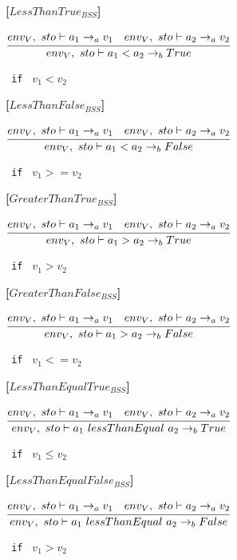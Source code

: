 \textbf{[$LessThanTrue_{BSS}$]}
\begin{center}
	\begin{math}
	\cfrac
	{env_V,\ sto \vdash a_1 \rightarrow_a v_1 \quad env_V,\ sto \vdash a_2 \rightarrow_a v_2}
	{env_V,\ sto \vdash a_1 < a_2 \rightarrow_b True}
	\end{math}
	
	\texttt{ if } $v_1 < v_2$
\end{center}

\textbf{[$LessThanFalse_{BSS}$]}
\begin{center}
	\begin{math}
	\cfrac
	{env_V,\ sto \vdash a_1 \rightarrow_a v_1 \quad env_V,\ sto \vdash a_2 \rightarrow_a v_2}
	{env_V,\ sto \vdash a_1 < a_2 \rightarrow_b False}
	\end{math}
	
	\texttt{ if } $v_1 >= v_2$
\end{center}

\textbf{[$GreaterThanTrue_{BSS}$]}
\begin{center}
	\begin{math}
	\cfrac
	{env_V,\ sto \vdash a_1 \rightarrow_a v_1 \quad env_V,\ sto \vdash a_2 \rightarrow_a v_2}
	{env_V,\ sto \vdash a_1 > a_2 \rightarrow_b True}
	\end{math}
	
	\texttt{ if } $v_1 > v_2$
\end{center}

\textbf{[$GreaterThanFalse_{BSS}$]}
\begin{center}
	\begin{math}
	\cfrac
	{env_V,\ sto \vdash a_1 \rightarrow_a v_1 \quad env_V,\ sto \vdash a_2 \rightarrow_a v_2}
	{env_V,\ sto \vdash a_1 > a_2 \rightarrow_b False}
	\end{math}
	
	\texttt{ if } $v_1 <= v_2$
\end{center}

\textbf{[$LessThanEqualTrue_{BSS}$]}
\begin{center}
	\begin{math}
	\cfrac
	{env_V,\ sto \vdash a_1 \rightarrow_a v_1 \quad env_V,\ sto \vdash a_2 \rightarrow_a v_2}
	{env_V,\ sto \vdash a_1\ lessThanEqual\ a_2 \rightarrow_b True}
	\end{math}
	
	\texttt{ if } $v_1 \leq v_2$
\end{center}

\textbf{[$LessThanEqualFalse_{BSS}$]}
\begin{center}
	\begin{math}
	\cfrac
	{env_V,\ sto \vdash a_1 \rightarrow_a v_1 \quad env_V,\ sto \vdash a_2 \rightarrow_a v_2}
	{env_V,\ sto \vdash a_1\ lessThanEqual\ a_2 \rightarrow_b False}
	\end{math}
	
	\texttt{ if } $v_1 > v_2$
\end{center}

